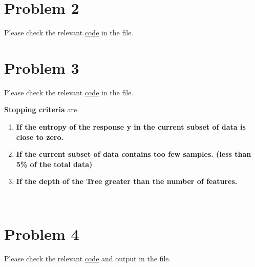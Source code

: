 \documentclass{article}
\begin{document}
\section*{Problem 2}
    \begin{center}
        Please check the relevant \href{https://github.com/z-zijie/2020Fall/blob/master/COMP760/Homework4/code.py}{code} in the file.
    \end{center}
\pagebreak

\section*{Problem 3}
    \begin{center}
        Please check the relevant \href{https://github.com/z-zijie/2020Fall/blob/master/COMP760/Homework4/code.py}{code} in the file.
    \end{center}
    \textbf{Stopping criteria} are
    \begin{enumerate}
        \item \textbf{If the entropy of the response y in the current subset of data is close to zero.}
        \item \textbf{If the current subset of data contains too few samples. (less than 5\% of the total data)}
        \item \textbf{If the depth of the Tree greater than the number of features.}
    \end{enumerate}\

\section*{Problem 4}
    \begin{center}
        Please check the relevant \href{https://github.com/z-zijie/2020Fall/blob/master/COMP760/Homework4/code.py}{code} and output in the file.
    \end{center}
    
\end{document}
